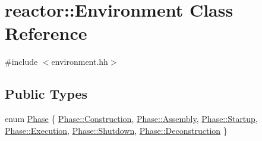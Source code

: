 \hypertarget{classreactor_1_1Environment}{}\section{reactor\+:\+:Environment Class Reference}
\label{classreactor_1_1Environment}


{\ttfamily \#include $<$environment.\+hh$>$}

\subsection*{Public Types}
\begin{DoxyCompactItemize}
\item 
enum \hyperlink{classreactor_1_1Environment_a2f0bcf10490e174246fc14b456fb0755}{Phase} \{ \newline
\hyperlink{classreactor_1_1Environment_a2f0bcf10490e174246fc14b456fb0755a2a0d30cb1153031c3dfc239c6e0407ea}{Phase\+::\+Construction}, 
\hyperlink{classreactor_1_1Environment_a2f0bcf10490e174246fc14b456fb0755ad75c45e11c8aeb13494dba59a388a164}{Phase\+::\+Assembly}, 
\hyperlink{classreactor_1_1Environment_a2f0bcf10490e174246fc14b456fb0755a13e685964c2548aa748f7ea263bad4e5}{Phase\+::\+Startup}, 
\hyperlink{classreactor_1_1Environment_a2f0bcf10490e174246fc14b456fb0755a8f44785c8c19412c5b6611db30984514}{Phase\+::\+Execution}, 
\newline
\hyperlink{classreactor_1_1Environment_a2f0bcf10490e174246fc14b456fb0755a1a4ebb180ba59b067782515ffee6e975}{Phase\+::\+Shutdown}, 
\hyperlink{classreactor_1_1Environment_a2f0bcf10490e174246fc14b456fb0755a7629cb3f7fc48e33116e336bdfd141fd}{Phase\+::\+Deconstruction}
 \}
\end{DoxyCompactItemize}
